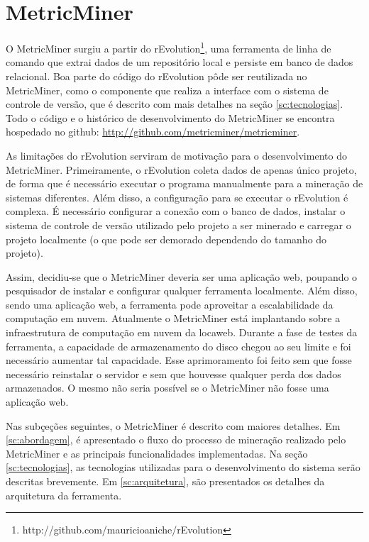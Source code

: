 \documentclass[a4paper, 12pt, twoside]{book}
\begin{document}
    
\chapter{MetricMiner} \label{ch:arquitetura}

    O MetricMiner surgiu a partir do rEvolution\footnote{http://github.com/mauricioaniche/rEvolution}, uma ferramenta de linha de comando que extrai dados de um repositório local e persiste em banco de dados  relacional. Boa parte do código do rEvolution pôde ser reutilizada no MetricMiner, como o componente que realiza a interface com o sistema de controle de versão, que é descrito com mais detalhes na seção \ref{sc:tecnologias}. Todo o código e o histórico de desenvolvimento do MetricMiner se encontra hospedado no github: \url{http://github.com/metricminer/metricminer}.

    As limitações do rEvolution serviram de motivação para o desenvolvimento do MetricMiner. Primeiramente, o rEvolution coleta dados de apenas único projeto, de forma que é necessário executar o programa manualmente para a mineração de sistemas diferentes. Além disso, a configuração para se executar o rEvolution é complexa. É necessário configurar a conexão com o banco de dados, instalar o sistema de controle de versão utilizado pelo projeto a ser minerado e carregar o projeto localmente (o que pode ser demorado dependendo do tamanho do projeto). 

    Assim, decidiu-se que o MetricMiner deveria ser uma aplicação web, poupando o pesquisador de instalar e configurar qualquer ferramenta localmente. Além disso, sendo uma aplicação web, a ferramenta pode aproveitar a escalabilidade da computação em nuvem. Atualmente o MetricMiner está implantando sobre a infraestrutura de computação em nuvem da locaweb. Durante a fase de testes da ferramenta, a capacidade de armazenamento do disco chegou ao seu limite e foi necessário aumentar tal capacidade. Esse aprimoramento foi feito sem que fosse necessário reinstalar o servidor e sem que houvesse qualquer perda dos dados armazenados. O mesmo não seria possível se o MetricMiner não fosse uma aplicação web.

    Nas subçeções seguintes, o MetricMiner é descrito com maiores detalhes. Em \ref{sc:abordagem}, é apresentado o fluxo do processo de mineração realizado pelo MetricMiner e as principais funcionalidades implementadas. Na seção \ref{sc:tecnologias}, as tecnologias utilizadas para o desenvolvimento do sistema serão descritas brevemente. Em \ref{sc:arquitetura}, são presentados os detalhes da arquitetura da ferramenta.
\end{document}
